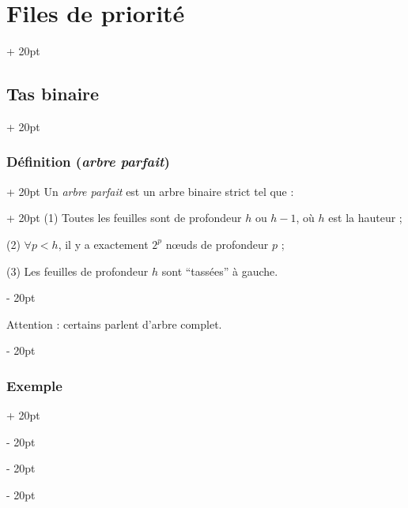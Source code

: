 \documentclass[a4paper, 12pt, twoside]{article}
\newcommand{\ind}[1][20pt]{\advance\leftskip + #1}
\newcommand{\deind}[1][20pt]{\advance\leftskip - #1}
\newenvironment{indt}[2][20pt]{#2 \par \ind[#1]}{\par \deind} %
\begin{document}
\begin{indt}{\section{Files de priorité}}
        \begin{indt}{\subsection{Tas binaire}}
            \begin{indt}{\subsubsection{Définition (\textit{arbre parfait})}}
                \begin{indt}{Un \textit{arbre parfait} est un arbre binaire strict tel que :}
                    (1) Toutes les feuilles sont de profondeur $h$ ou $h - 1$, où $h$ est la hauteur ;
                    
                    (2) $\forall p < h$, il y a exactement $2^p$ n\oe uds de profondeur $p$ ;
                    
                    (3) Les feuilles de profondeur $h$ sont ``tassées'' à gauche.
                \end{indt}
                
                \vspace{12pt}
                
                Attention : certains parlent d'arbre complet.
            \end{indt}
            
            \vspace{12pt}
            
            \begin{indt}{\subsubsection{Exemple}}
                \label{3.2.2}
                
                \begin{center}
                \end{center}
            \end{indt}
            

\end{indt}
\end{indt}
\end{document}
